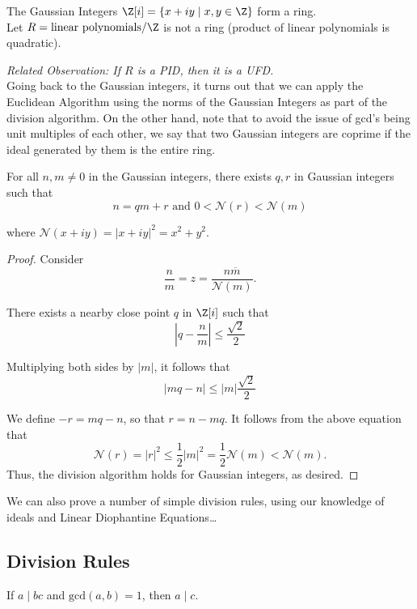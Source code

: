 \documentclass[11pt]{article}
\begin{document}
\begin{exercise}
The Gaussian Integers $\Z[i] = \{ x + iy \mid x, y \in \Z \}$ form a ring. \\

Let $R = \text{linear polynomials} / \Z$ is not a ring (product of linear polynomials is quadratic).
\end{exercise}

\textit{Related Observation: If $R$ is a PID, then it is a UFD.} \\

Going back to the Gaussian integers, it turns out that we can apply the Euclidean Algorithm using the norms of the Gaussian Integers as part of the division algorithm.
On the other hand, note that to avoid the issue of gcd's being unit multiples of each other, we say that two Gaussian integers are coprime if the ideal generated by them is the entire ring.

\begin{lemma}
For all $n, m \neq 0$ in the Gaussian integers, there exists $q, r$ in Gaussian integers such that
\[
    n = qm + r \text{ and } 0 < \mathcal{N}(r) < \mathcal{N}(m)
\]

where $\mathcal{N}(x+iy) = |x+iy|^2 = x^2 + y^2$.
\end{lemma}

\begin{proof}
Consider
\[
    \frac{n}{m} = z = \frac{n \overline{m}}{\mathcal{N}(m)}.
\] 

There exists a nearby close point $q$ in $\Z[i]$ such that 
\[
    \left| q - \frac{n}{m} \right| \leq \frac{\sqrt{2}}{2}
\]

Multiplying both sides by $|m|$, it follows that
\[
    |mq - n| \leq |m|\frac{\sqrt{2}}{2}
\]

We define $-r = mq - n$, so that $r = n - mq$. It follows from the above equation that
\[
    \mathcal{N}(r) = |r|^2 \leq \frac{1}{2}|m|^2 = \frac{1}{2}\mathcal{N}(m) < \mathcal{N}(m).
\]
Thus, the division algorithm holds for Gaussian integers, as desired.
\end{proof}

We can also prove a number of simple division rules, using our knowledge of ideals and Linear Diophantine Equations\dots

\subsection{Division Rules}
\begin{theorem}\label{thm:rel_prime_div}
If $a \mid bc$ and $\mathrm{gcd}(a, b) = 1$, then $a \mid c$.     
\end{theorem}
\end{document}
